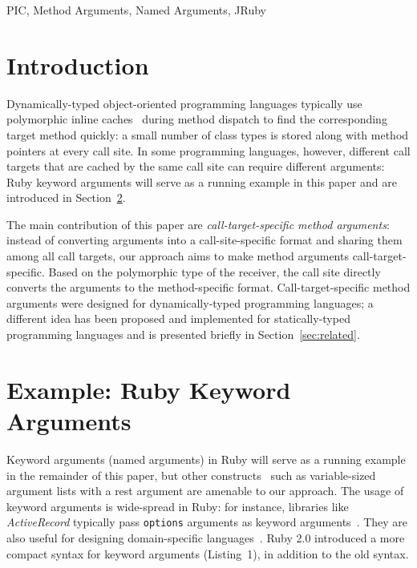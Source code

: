 \documentclass{sigplanconf} %
\begin{document}

\keywords
PIC, Method Arguments, Named Arguments, JRuby %

\section{Introduction}
Dynamically-typed object-oriented programming languages typically use polymorphic inline caches~\cite{Holzle:1991:ODO:646149.679193} during method dispatch to find the corresponding target method quickly: a small number of class types is stored along with method pointers at every call site. In some programming languages, however, different call targets that are cached by the same call site can require different arguments: Ruby keyword arguments will serve as a running example in this paper and are introduced in Section~\ref{sec:kwargs}. 

The main contribution of this paper are \emph{call-target-specific method arguments}: instead of converting arguments into a call-site-specific format and sharing them among all call targets, our approach aims to make method arguments call-target-specific. Based on the polymorphic type of the receiver, the call site directly converts the arguments to the method-specific format. Call-target-specific method arguments were designed for dynamically-typed programming languages; a different idea has been proposed and implemented for statically-typed programming languages and is presented briefly in Section~\ref{sec:related}.

\section{Example: Ruby Keyword Arguments}
\label{sec:kwargs}
Keyword arguments (named arguments) in Ruby will serve as a running example in the remainder of this paper, but other constructs~\cite{Zdun05patternsof} such as variable-sized argument lists with a rest argument are amenable to our approach. The usage of keyword arguments is wide-spread in Ruby: for instance, libraries like \emph{ActiveRecord} typically pass \lstinline{options} arguments as keyword arguments~\cite{Carlson:2015}. They are also useful for designing domain-specific languages~\cite{Gunther:2010:DPI:2493288.2493291}. Ruby 2.0 introduced a more compact syntax for keyword arguments (Listing~1), in addition to the old syntax. 
\end{document}
